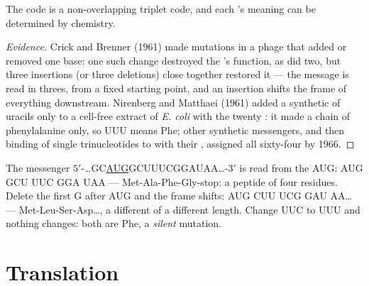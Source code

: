 \begin{proposition}\label{prop:b1:gene-expression:nirenberg}
The code is a non-overlapping triplet code, and each 's meaning
can be determined by chemistry.
\end{proposition}
\begin{proof}[Evidence]
Crick and Brenner (1961) made mutations in a phage  that added or
removed one base: one such change destroyed the 's function, as
did two, but three insertions (or three deletions) close together
restored it --- the message is read in threes, from a fixed starting
point, and an insertion shifts the frame of everything downstream.
Nirenberg and Matthaei (1961) added a synthetic  of uracils only to
a cell-free extract of \emph{E. coli} with the twenty : it
made a chain of phenylalanine only, so UUU means Phe; other synthetic
messengers, and then binding of single trinucleotides to 
with their , assigned all sixty-four by 1966.
\end{proof}

\begin{example}\label{ex:b1:gene-expression:reading}
The messenger $5'$-\ldots{}GC\underline{AUG}GCUUUCGGAUAA\ldots{}-$3'$
is read from the AUG: AUG GCU UUC GGA UAA --- Met-Ala-Phe-Gly-stop: a
peptide of four residues. Delete the first G after AUG and the frame
shifts: AUG CUU UCG GAU AA\ldots{} --- Met-Leu-Ser-Asp\ldots, a
different  of a different length. Change UUC to UUU and nothing
changes: both are Phe, a \emph{silent} mutation.
\end{example}

\section{Translation}

